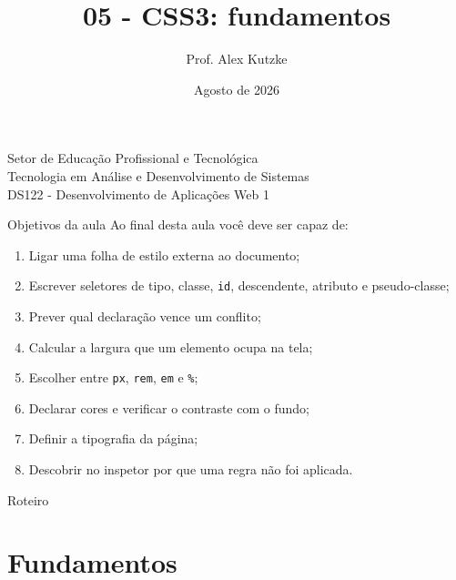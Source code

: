 \documentclass{beamer}
\title{05 - CSS3: fundamentos}
\author{Prof. Alex Kutzke}
\date{Agosto de 2026}
\begin{document}
\begin{frame}
	\begin{center}
		\large{Setor de Educação Profissional e Tecnológica}\\
		Tecnologia em Análise e Desenvolvimento de Sistemas\\
		\vspace{1cm}
		\small{DS122 - Desenvolvimento de Aplicações Web 1}
	\end{center}
	\titlepage
\end{frame}

\begin{frame}{Objetivos da aula}
	Ao final desta aula você deve ser capaz de:
	\begin{enumerate}
		\item Ligar uma folha de estilo externa ao documento;
		\item Escrever seletores de tipo, classe, \texttt{id}, descendente, atributo
		      e pseudo-classe;
		\item Prever qual declaração vence um conflito;
		\item Calcular a largura que um elemento ocupa na tela;
		\item Escolher entre \texttt{px}, \texttt{rem}, \texttt{em} e \texttt{\%};
		\item Declarar cores e verificar o contraste com o fundo;
		\item Definir a tipografia da página;
		\item Descobrir no inspetor por que uma regra não foi aplicada.
	\end{enumerate}
\end{frame}

\begin{frame}{Roteiro}
	\tableofcontents
\end{frame}

\section{Fundamentos}
\end{document}
